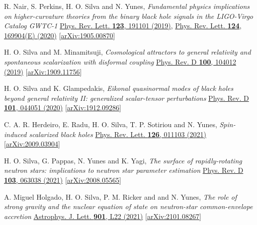 \documentclass[10pt]{article}
\begin{document}
\begin{bibenum}
    \item R. Nair, S. Perkins, H. O. Silva and N. Yunes,
    \emph{Fundamental physics implications on higher-curvature theories from
          the binary black hole signals in the LIGO-Virgo Catalog GWTC-1}
    \href{https://link.aps.org/doi/10.1103/PhysRevLett.123.191101}{Phys. Rev. Lett. {\bf 123}, 191101 (2019)},
    \href{https://journals.aps.org/prl/abstract/10.1103/PhysRevLett.124.169904}{Phys. Rev. Lett. {\bf 124}, 169904(E) (2020)}
    [\href{https://arxiv.org/abs/1905.00870}{arXiv:1905.00870}]
    \label{pub:nairPRL2020}

    \item H. O. Silva and M. Minamitsuji,
    \emph{Cosmological attractors to general relativity and spontaneous scalarization with disformal coupling}
    \href{https://link.aps.org/doi/10.1103/PhysRevD.100.104012}{Phys. Rev. D {\bf 100}, 104012 (2019)}
    [\href{https://arxiv.org/abs/1909.11756}{arXiv:1909.11756}]

    \item H. O. Silva and K. Glampedakis,
    \emph{Eikonal quasinormal modes of black holes beyond general relativity II: generalized scalar-tensor perturbations}
    \href{https://journals.aps.org/prd/abstract/10.1103/PhysRevD.101.044051}{Phys. Rev. D {\bf 101}, 044051 (2020)}
    [\href{https://arxiv.org/abs/1912.09286}{arXiv:1912.09286}]

    \item C. A. R. Herdeiro, E. Radu, H. O. Silva, T. P. Sotiriou and N. Yunes,
    \emph{Spin-induced scalarized black holes}
    \href{https://journals.aps.org/prl/abstract/10.1103/PhysRevLett.126.011103}{Phys. Rev. Lett. {\bf 126}, 011103 (2021)}
    [\href{https://arxiv.org/abs/2009.03904}{arXiv:2009.03904}]

    \item H. O. Silva, G. Pappas, N. Yunes and K. Yagi,
    \emph{The surface of rapidly-rotating neutron stars: implications to neutron star parameter estimation}
    \href{https://journals.aps.org/prd/abstract/10.1103/PhysRevD.103.063038}{Phys. Rev. D {\bf 103}, 063038 (2021)}
    [\href{https://arxiv.org/abs/2008.05565}{arXiv:2008.05565}]

    \item A. Miguel Holgado, H. O. Silva, P. M. Ricker and and N. Yunes,
    \emph{The role of strong gravity and the nuclear equation of state on neutron-star common-envelope accretion}
    \href{https://iopscience.iop.org/article/10.3847/2041-8213/abecdd}{Astrophys. J. Lett. {\bf 901}, L22 (2021)}
    [\href{https://arxiv.org/abs/2102.08267}{arXiv:2101.08267}]


\end{bibenum}
\end{document}
